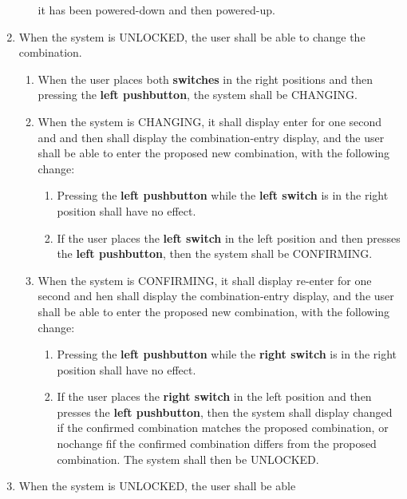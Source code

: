 \begin{enumerate}
\begin{enumerate}
        it has been powered-down and then powered-up.
    \end{enumerate}
\item \label{spec:changeCombination} When the system is UNLOCKED, the user shall
    be able to change the combination.
    \begin{enumerate}
    \item When the user places both \textbf{switches} in the right positions and
        then pressing the \textbf{left pushbutton}, the system shall be
        CHANGING.
    \item When the system is CHANGING, it shall display {\dviiseg enter} for
        one second and and then shall display the combination-entry display, and
        the user shall be able to enter the proposed new combination, with the
        following change:
        \begin{enumerate}
        \item Pressing the \textbf{left pushbutton} while the
            \textbf{left switch} is in the right position shall have no effect.
        \item If the user places the \textbf{left switch} in the left position
            and then presses the \textbf{left pushbutton}, then the system
            shall be CONFIRMING.
        \end{enumerate}
    \item When the system is CONFIRMING, it shall display {\dviiseg re-enter}
        for one second and hen shall display the combination-entry display, and
        the user shall be able to enter the proposed new combination, with the
        following change:
        \begin{enumerate}
        \item Pressing the \textbf{left pushbutton} while the
            \textbf{right switch} is in the right position shall have no effect.
        \item If the user places the \textbf{right switch} in the left position
            and then presses the \textbf{left pushbutton}, then the system
            shall display {\dviiseg changed} if the confirmed
            combination matches the proposed combination, or {\dviiseg nochange}
            fif the confirmed combination differs from the proposed
            combination. The system shall then be UNLOCKED.
        \end{enumerate}
    \end{enumerate}
\item \label{spec:locking} When the system is UNLOCKED, the user shall be able

\end{enumerate}

